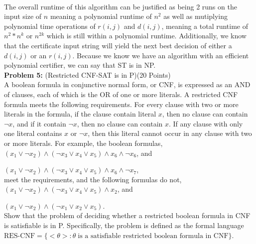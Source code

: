 \documentclass[11pt]{amsart}
\begin{document}
\newpage
\hrulefill \\
The overall runtime of this algorithm can be justified as being 2 runs on the input size of $n$ meaning a polynomial runtime of $n^2$ as well as mutiplying polynomial time operations of $r(i, j)$ and $d(i, j)$, meaning a total runtime of $n^2 * n^k$ or $n^{2k}$ which is still within a polynomial runtime. Additionally, we know that the certificate input string will yield the next best decision of either a $d(i, j)$ or an $r(i, j)$. Because we know we have an algorithm with an efficient polynomial certifier, we can say that ST is in NP.
\newpage
\hrulefill \\
\textbf{Problem 5:} (Restricted CNF-SAT is in P)\hfill (20 Points)\\

A boolean formula in conjunctive normal form, or CNF, is expressed as an AND of clauses, each of which is the OR of one or more literals. A restricted CNF formula meets the following requirements. For every clause with two or more literals in the formula, if the clause contain literal $x$, then no clause can contain $\neg x$, and if it contain $\neg x$, then no clause can contain $x$. If any clause with only one literal contains $x$ or $\neg x$, then this literal cannot occur in any clause with two or more literals. For example, the boolean formulas, \\

$(x_1 \vee \neg x_2 ) \wedge (\neg x_3 \vee x_4 \vee x_5 ) \wedge x_6 \wedge \neg x_6$, and

$(x_1 \vee \neg x_2 ) \wedge (\neg x_3 \vee x_4 \vee x_5 ) \wedge x_6 \wedge \neg x_7$, \\

meet the requirements, and the following formulas do not, \\

$(x_1 \vee \neg x_2 ) \wedge (\neg x_3 \vee x_4 \vee x_5 ) \wedge x_2$, and

$(x_1 \vee \neg x_2 ) \wedge (\neg x_1 \vee x_2 \vee x_5 )$. \\

Show that the problem of deciding whether a restricted boolean formula in CNF is satisfiable is in P. Specifically, the problem is defined as the formal language \\

$\textrm{RES-CNF} = \{ <\theta> : \theta \; \textrm{is a satisfiable restricted boolean formula in CNF} \}$. \\
\end{document}
